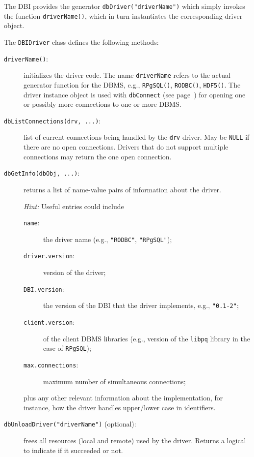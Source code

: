 \documentclass{article}
\newcommand{\sfun}[1]{\mbox{\tt #1()}}  %
\newcommand{\sobj}[1]{\mbox{\tt #1}}    %
\newcommand{\sexp}[1]{\mbox{\tt #1}}    %
\newcommand{\sclass}[1]{\mbox{\tt #1}}  %
\newcommand{\smethod}[1]{\mbox{\tt #1}} %
\begin{document}
The DBI provides the generator \sexp{dbDriver("driverName")} 
which simply invokes the function \sfun{driverName}, which
in turn instantiates the corresponding driver object.

The \sclass{DBIDriver} class defines the following methods:
\begin{description}

\item[\sfun{driverName}:]\label{meth:driverName}
  initializes the driver code. The name \sobj{driverName} refers to
  the actual generator function for the DBMS, e.g., \sfun{RPgSQL},
  \sfun{RODBC}, \sfun{HDF5}.  The driver instance object is used
  with \smethod{dbConnect} (see page~\pageref{meth:dbConnect})
  for opening one or possibly more connections to one or more DBMS.

\item[\smethod{dbListConnections(drv, ...)}:]
  list of current connections being handled by the \sobj{drv}
  driver.  May be \sobj{NULL} if there are no open connections.
  Drivers that do not support multiple connections may return the
  one open connection.

\item[\smethod{dbGetInfo(dbObj, ...)}:]
  returns a list of name-value pairs of information about the
  driver.  

  \emph{Hint:} Useful entries could include 
  \begin{description}
  \item[\sobj{name}:] the driver name (e.g., \sexp{"RODBC"}, \sexp{"RPgSQL"}); 
  \item[\sobj{driver.version}:] version of the driver;
  \item[\sobj{DBI.version}:] the version of the DBI that the driver 
   implements, e.g., \sexp{"0.1-2"};
  \item[\sobj{client.version}:] of the client DBMS libraries (e.g., version
  of the \texttt{libpq} library in the case of \sobj{RPgSQL});
  \item[\sobj{max.connections}:] maximum number of simultaneous 
  connections; 
  \end{description}
  plus any other relevant information about the implementation, for instance, 
  how the driver handles upper/lower case in identifiers.

\item[\smethod{dbUnloadDriver("driverName")} (optional):]
  frees all resources (local and remote) used by the driver.  
  Returns a logical to indicate if it succeeded or not.
 
\end{description}
\end{document}
